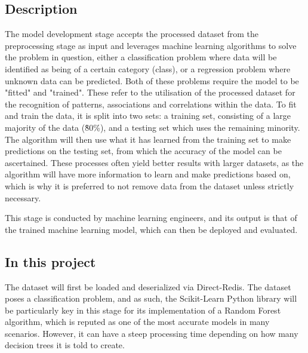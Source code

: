 \subsection{Description}
The model development stage accepts the processed dataset from the preprocessing stage as input and leverages 
machine learning algorithms to solve the problem in question, either a classification problem where 
data will be identified as being of a certain category (class), or a regression problem where unknown 
data can be predicted. Both of these problems require the model to be "fitted" and "trained".
These refer to the utilisation of the processed dataset for the recognition of patterns, 
associations and correlations within the data. To fit and train the data, it is split into two sets:
a training set, consisting of a large majority of the data (\~80\%), and a testing set which uses the 
remaining minority. The algorithm will then use what it has learned from the training set to make predictions 
on the testing set, from which the accuracy of the model can be ascertained. These processes often yield better
results with larger datasets, as the algorithm will have more information to learn and make predictions based on,
which is why it is preferred to not remove data from the dataset unless strictly necessary.

\para This stage is conducted by machine learning engineers, and its output is that of the trained machine learning 
model, which can then be deployed and evaluated.

\subsection{In this project}
The dataset will first be loaded and deserialized via Direct-Redis. The dataset poses a classification 
problem, and as such, the Scikit-Learn Python library 
will be particularly key in this stage for its implementation of a Random Forest algorithm, which is 
reputed as one of the most accurate models in many scenarios. However, it can have a steep processing
time depending on how many decision trees it is told to create. 

